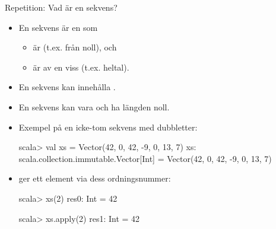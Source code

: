 

\begin{Slide}{Repetition: Vad är en sekvens?}
\begin{itemize}
\item En sekvens är en  som
  \begin{itemize}
   \item är  (t.ex. från noll), och
   \item är av en viss  (t.ex. heltal).
  \end{itemize}
  \pause
\item En sekvens kan innehålla .
\item En sekvens kan vara  och ha längden noll.
\item Exempel på en icke-tom sekvens med dubbletter:
\begin{REPLnonum}
scala> val xs = Vector(42, 0, 42, -9, 0, 13, 7)
xs: scala.collection.immutable.Vector[Int] =
  Vector(42, 0, 42, -9, 0, 13, 7)
\end{REPLnonum}
\pause
\item {} ger ett element via dess ordningsnummer:
\begin{REPL}
scala> xs(2)
res0: Int = 42

scala> xs.apply(2)
res1: Int = 42
\end{REPL}
\end{itemize}
\end{Slide}






